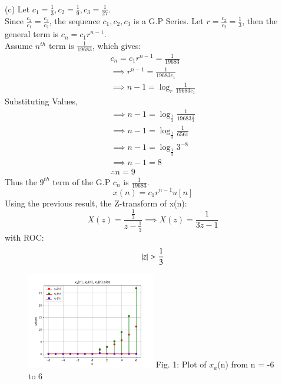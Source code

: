 \documentclass[journal,12pt,twocolumn]{IEEEtran}
\theoremstyle{remark}
\begin{document}
(c) Let $c_1 = \frac{1}{3}, c_2 = \frac{1}{9}, c_3 = \frac{1}{27}$.\\
Since $\frac{c_2}{c_1} = \frac{c_3}{c_2}$, the sequence $c_1, c_2, c_3$ is a G.P Series.
Let $r = \frac{c_2}{c_2} = \frac{1}{3}$, then the general term is $c_n = c_1 r^{n-1}$.\\
Assume $n^{th}$ term is $\frac{1}{19683}$, which gives: 
\begin{gather*}
    c_n = c_1 r^{n-1} = \frac{1}{19683}\\
    \implies r^{n-1} = \frac{1}{19683 c_1}\\
    \implies n - 1 = \log_{r}{\frac{1}{19683 c_1}}
\end{gather*}
Substituting Values,
\begin{gather*}
    \implies n - 1 = \log_{\frac{1}{3}}{\frac{1}{19683 \frac{1}{3}}}\\
    \implies n - 1 = \log_{\frac{1}{3}}{\frac{1}{6561}}\\
    \implies n - 1 = \log_{\frac{1}{3}}{3^{-8}}\\
    \implies n - 1 = 8\\
    \therefore n = 9
\end{gather*}
Thus the $9^{th}$ term of the G.P $c_n$ is $\frac{1}{19683}$.
\[ x(n) = c_1r^{n - 1}u[n] \]
Using the previous result, the Z-transform of x(n):
\[
    X(z) = \frac{\frac{1}{3}}{z - \frac{1}{3}}
    \implies X(z) = \frac{1 }{3z - 1}
\] with ROC: \[ \left\vert z\right\vert > \frac{1}{3} \]
\begin{figure}[h!]
    \centering
    \includegraphics[width=0.5\textwidth]{figs/a.png}
    Fig. 1: Plot of $x_a$(n) from n = -6 to 6
    \label{fig:img1}
\end{figure}
\end{document}
